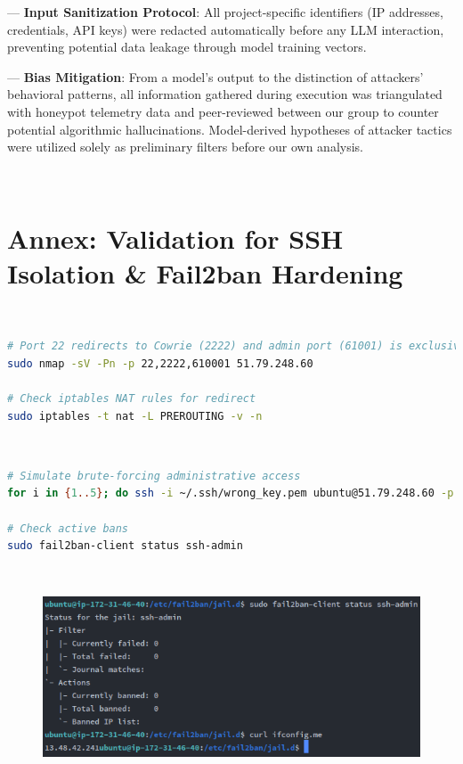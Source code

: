 --- \textbf{Input Sanitization Protocol}: All project-specific identifiers (IP addresses, credentials, API
keys) were redacted automatically before any LLM interaction, preventing potential data leakage through model training vectors.


--- \textbf{Bias Mitigation}: From a model's output to the distinction of attackers' behavioral patterns, all information gathered during execution was triangulated with honeypot telemetry data and peer-reviewed between our group to counter potential algorithmic hallucinations. Model-derived hypotheses of attacker tactics were utilized solely as preliminary filters before our own analysis.

\



\newpage

\section{Annex: Validation for SSH Isolation \& Fail2ban Hardening} 
\label{annex:network}
\
\
\begin{lstlisting}[language=bash, label={annexes:network}, caption={Network Isolation Verification}]  
# Port 22 redirects to Cowrie (2222) and admin port (61001) is exclusive  
sudo nmap -sV -Pn -p 22,2222,610001 51.79.248.60

# Check iptables NAT rules for redirect
sudo iptables -t nat -L PREROUTING -v -n  
\end{lstlisting}  
\


\begin{lstlisting}[language=bash, label={annexes:fail2ban}, caption={Fail2ban Efficacy Testing}]  
# Simulate brute-forcing administrative access 
for i in {1..5}; do ssh -i ~/.ssh/wrong_key.pem ubuntu@51.79.248.60 -p 61001; done  

# Check active bans  
sudo fail2ban-client status ssh-admin  
\end{lstlisting}  
\

\begin{figure}[h!]
\centering
    \includegraphics[width=0.8\linewidth]{doc/img/annex_b_listing_2.png}
\end{figure}

